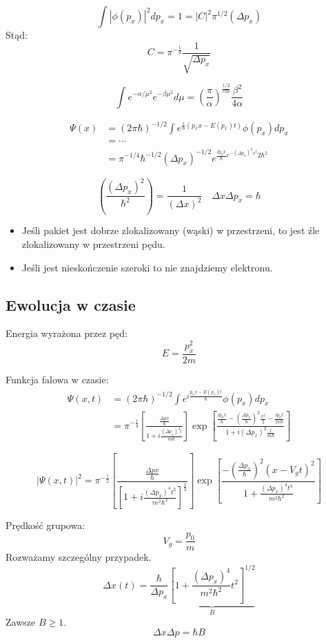 \[
\int |\phi(p_x)|^2 dp_x = 1 = |C|^2 \pi^{1/2} (\Delta p_x)
\]
Stąd:
\[
C = \pi^{-\frac{1}{4}} \frac{1}{\sqrt{\Delta p_x}}
\]

\[
\int e^{-\alpha/\mu^2} e^{-\beta \mu^2} d\mu = \left(\frac{\pi}{\alpha}\right)^\frac{1/2} \exp{\frac{\beta^2}{4\alpha}}
\]

\begin{align*}
\Psi(x) &= (2\pi\hbar)^{-1/2} \int e^{\frac{i}{\hbar} (p_x x - E(p_x) t)} \phi(p_x) dp_x \\
&= \cdots \\
&= \pi^{-1/4} \hbar^{-1/2} (\Delta p_x)^{-1/2} e^{\frac{ip_0 x}{\hbar} e^{-(\Delta p_x)^2 x^2}{2\hbar^2}}
\end{align*}

\[
(\frac{(\Delta p_x)^2}{\hbar^2}) = \frac{1}{(\Delta x)^2} \quad \Delta x \Delta p_x = \hbar
\]
\begin{itemize}
    \item Jeśli pakiet jest dobrze zlokalizowany (wąski) w przestrzeni, to jest źle zlokalizowany w przestrzeni pędu.
    \item Jeśli jest nieskończenie szeroki to nie znajdziemy elektronu.
\end{itemize}

\subsection{Ewolucja w czasie}

Energia wyrażona przez pęd:
\[
E = \frac{p_x^2}{2m}
\]

Funkcja falowa w czasie:
\begin{align*}
\Psi(x,t) &= \left(2\pi\hbar \right)^{-1/2} \int e^{i\frac{p_x x - E(p_x)t}{\hbar}} \phi(p_x) dp_x \\
&= \pi^{-\frac{1}{4}}\left[\frac{\frac{\Delta p x}{\hbar}}{1+i\frac{(\Delta p_x)^2 t}{m\hbar}}\right] \exp\left[\frac{\frac{ip_0 x}{\hbar}-\left(\frac{\Delta p_x}{\hbar}\right)^2\frac{x^2}{2}-\frac{ip_0 t}{2x\hbar}}{1+i(\Delta p_x)^2 \frac{t}{m\hbar}}\right]
\end{align*}

\[
|\Psi(x,t)|^2 = \pi^{-\frac{1}{2}}\left[\frac{\frac{\Delta p x}{\hbar}}{\left[1+i\frac{(\Delta p_x)^4 t^2}{m^2\hbar^2}\right]^{\frac{1}{2}}}\right] \exp\left[\frac{-\left(\frac{\Delta p_x}{\hbar}\right)^2(x-V_gt)^2}{1+\frac{(\Delta p_x)^4 t^4}{m^2\hbar^2}}\right]
\]

Prędkość grupowa:
\[
V_g = \frac{p_0}{m}
\]
Rozważamy szczególny przypadek.
\[
\Delta x (t) = \frac{\hbar}{\Delta p_x} \underbrace{\left[1 + \frac{(\Delta p_x)^4}{m^2\hbar^2}t^2\right]^{1/2}}_{B}
\]
Zawsze $B \geq 1$.
\[
\Delta x \Delta p = \hbar B
\]

